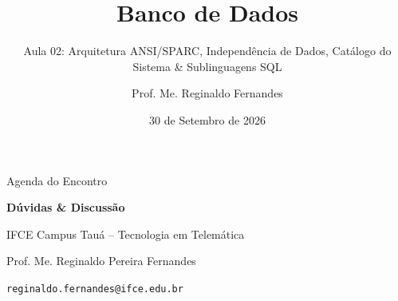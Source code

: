 \documentclass[aspectratio=169,utf8,t]{beamer}
\author{Prof. Me. Reginaldo Fernandes}
\institute{Instituto Federal do Ceará -- Campus Tauá \\ Tecnologia em Telemática}
\title{Banco de Dados}
\subtitle{Aula 02: Arquitetura ANSI/SPARC, Independência de Dados, Catálogo do Sistema \& Sublinguagens SQL}
\date{30 de Setembro de 2026}
\begin{document}
\frame[plain]{\titlepage}

\begin{frame}{Agenda do Encontro}
  \vspace{0.4cm}
  \tableofcontents
\end{frame}










\begin{frame}[plain]
  \vspace{2cm}
  \centering
  {\Huge \textbf{Dúvidas \& Discussão}}\par
  \vspace{0.8cm}
  {\large IFCE Campus Tauá -- Tecnologia em Telemática}\par
  \vspace{0.3cm}
  {\small Prof. Me. Reginaldo Pereira Fernandes}\par
  {\scriptsize \texttt{reginaldo.fernandes@ifce.edu.br}}
\end{frame}
\end{document}
